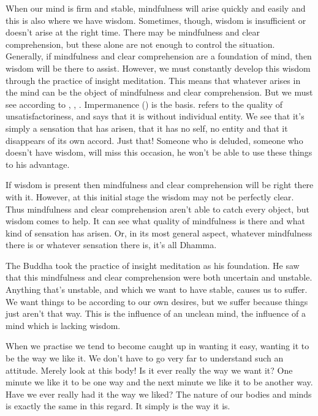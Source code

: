 When our mind is firm and stable, mindfulness will arise quickly and easily and this is also where we have wisdom. Sometimes, though, wisdom is insufficient or doesn't arise at the right time. There may be mindfulness and clear comprehension, but these alone are not enough to control the situation. Generally, if mindfulness and clear comprehension are a foundation of mind, then wisdom will be there to assist. However, we must constantly develop this wisdom through the practice of insight meditation. This means that whatever arises in the mind can be the object of mindfulness and clear comprehension. But we must see according to , , . Impermanence () is the basis.  refers to the quality of unsatisfactoriness, and  says that it is without individual entity. We see that it's simply a sensation that has arisen, that it has no self, no entity and that it disappears of its own accord. Just that! Someone who is deluded, someone who doesn't have wisdom, will miss this occasion, he won't be able to use these things to his advantage. 

If wisdom is present then mindfulness and clear comprehension will be right there with it. However, at this initial stage the wisdom may not be perfectly clear. Thus mindfulness and clear comprehension aren't able to catch every object, but wisdom comes to help. It can see what quality of mindfulness is there and what kind of sensation has arisen. Or, in its most general aspect, whatever mindfulness there is or whatever sensation there is, it's all Dhamma. 

The Buddha took the practice of insight meditation as his foundation. He saw that this mindfulness and clear comprehension were both uncertain and unstable. Anything that's unstable, and which we want to have stable, causes us to suffer. We want things to be according to our own desires, but we suffer because things just aren't that way. This is the influence of an unclean mind, the influence of a mind which is lacking wisdom. 

When we practise we tend to become caught up in wanting it easy, wanting it to be the way we like it. We don't have to go very far to understand such an attitude. Merely look at this body! Is it ever really the way we want it? One minute we like it to be one way and the next minute we like it to be another way. Have we ever really had it the way we liked? The nature of our bodies and minds is exactly the same in this regard. It simply is the way it is. 

